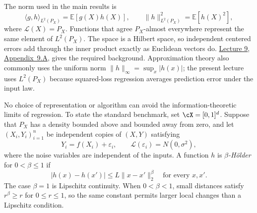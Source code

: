 \documentclass[11pt,twoside]{article}
\newcommand{\E}{\mathbb E}
\newcommand{\Law}{\mathcal L}
\theoremstyle{definition}
\theoremstyle{remark}
\begin{document}
The norm used in the main results is
\begin{equation}
 \langle g,h\rangle_{L^2(P_X)}=\E[g(X)h(X)],
 \qquad
 \|h\|_{L^2(P_X)}^2=\E[h(X)^2],
 \label{eq:l2-inner-product}
\end{equation}
where $\Law(X)=P_X$. Functions that agree $P_X$-almost everywhere represent
the same element of $L^2(P_X)$. The space is a Hilbert space, so independent
centered errors add through the inner product exactly as Euclidean vectors do.
\href{lecture09.pdf}{Lecture 9},
\href{lecture09.pdf\#nameddest=appendix.A}{Appendix~9.A}, gives the required
background. Approximation theory also commonly uses the uniform norm
$\|h\|_\infty=\sup_x|h(x)|$; the present
lecture uses $L^2(P_X)$ because squared-loss regression averages prediction
error under the input law.

No choice of representation or algorithm can avoid the information-theoretic
limits of regression. To state the standard benchmark, set
$\cX=[0,1]^d$. Suppose that $P_X$ has a
density bounded above and bounded away from zero, and let
$(X_i,Y_i)_{i=1}^n$ be independent copies of $(X,Y)$ satisfying
\begin{equation}
 Y_i=f(X_i)+\varepsilon_i,
 \qquad
 \Law(\varepsilon_i)=N(0,\sigma^2),
 \label{eq:regression-model}
\end{equation}
where the noise variables are independent of the inputs. A function $h$ is
\emph{$\beta$-H\"older} for $0<\beta\leq1$ if
\begin{equation}
 |h(x)-h(x')|\leq L\|x-x'\|_2^\beta
 \quad\text{for every }x,x'.
 \label{eq:beta-holder}
\end{equation}
The case $\beta=1$ is Lipschitz continuity. When $0<\beta<1$, small distances
satisfy $r^\beta\geq r$ for $0\leq r\leq1$, so the same constant permits
larger local changes than a Lipschitz condition.
\end{document}
